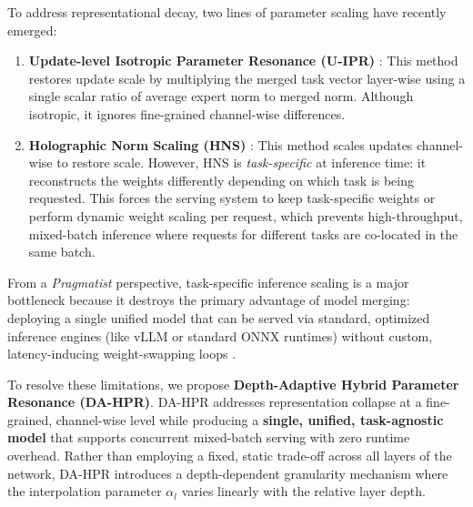 \documentclass{article}
\theoremstyle{plain}
\theoremstyle{definition}
\theoremstyle{remark}
\begin{document}
To address representational decay, two lines of parameter scaling have recently emerged:
\begin{enumerate}
    \item \textbf{Update-level Isotropic Parameter Resonance (U-IPR)} \cite{submission9_reference}: This method restores update scale by multiplying the merged task vector layer-wise using a single scalar ratio of average expert norm to merged norm. Although isotropic, it ignores fine-grained channel-wise differences.
    \item \textbf{Holographic Norm Scaling (HNS)} \cite{submission7_reference}: This method scales updates channel-wise to restore scale. However, HNS is \emph{task-specific} at inference time: it reconstructs the weights differently depending on which task is being requested. This forces the serving system to keep task-specific weights or perform dynamic weight scaling per request, which prevents high-throughput, mixed-batch inference where requests for different tasks are co-located in the same batch.
\end{enumerate}

From a \emph{Pragmatist} perspective, task-specific inference scaling is a major bottleneck because it destroys the primary advantage of model merging: deploying a single unified model that can be served via standard, optimized inference engines (like vLLM or standard ONNX runtimes) without custom, latency-inducing weight-swapping loops \cite{serving_latency_survey}.

To resolve these limitations, we propose \textbf{Depth-Adaptive Hybrid Parameter Resonance (DA-HPR)}.
DA-HPR addresses representation collapse at a fine-grained, channel-wise level while producing a \textbf{single, unified, task-agnostic model} that supports concurrent mixed-batch serving with zero runtime overhead.
Rather than employing a fixed, static trade-off across all layers of the network, DA-HPR introduces a depth-dependent granularity mechanism where the interpolation parameter $\alpha_l$ varies linearly with the relative layer depth.
\end{document}
